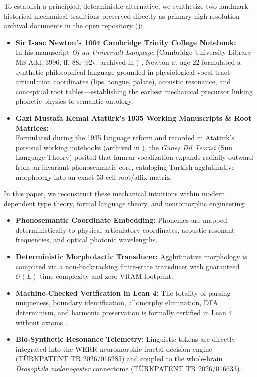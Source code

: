 \documentclass[11pt,letterpaper]{article}
\begin{document}
To establish a principled, deterministic alternative, we synthesize two landmark historical mechanical traditions preserved directly as primary high-resolution archival documents in the open repository ():
\begin{itemize}
    \item \textbf{Sir Isaac Newton's 1664 Cambridge Trinity College Notebook:}\\
    In his manuscript \textit{Of an Universall Language} (Cambridge University Library MS Add. 3996, ff. 88r--92v; archived in ) \cite{newton1664universal}, Newton at age 22 formulated a synthetic philosophical language grounded in physiological vocal tract articulation coordinates (lips, tongue, palate), acoustic resonance, and conceptual root tables---establishing the earliest mechanical precursor linking phonetic physics to semantic ontology.
    \item \textbf{Gazi Mustafa Kemal Atat\"{u}rk's 1935 Working Manuscripts \& Root Matrices:}\\
    Formulated during the 1935 language reform and recorded in Atat\"{u}rk's personal working notebooks \cite{ataturk1935nobet, kosay1936gunes, tdk1936kurultay} (archived in ), the \textit{G\"{u}ne\c{s} Dil Teorisi} (Sun Language Theory) posited that human vocalization expands radially outward from an invariant phonosemantic core, cataloging Turkish agglutinative morphology into an exact 53-cell root/affix matrix.
\end{itemize}

In this paper, we reconstruct these mechanical intuitions within modern dependent type theory, formal language theory, and neuromorphic engineering:
\begin{itemize}
    \item \textbf{Phonosemantic Coordinate Embedding:} Phonemes are mapped deterministically to physical articulatory coordinates, acoustic resonant frequencies, and optical photonic wavelengths.
    \item \textbf{Deterministic Morphotactic Transducer:} Agglutinative morphology is computed via a non-backtracking finite-state transducer with guaranteed $\mathcal{O}(L)$ time complexity and zero VRAM footprint.
    \item \textbf{Machine-Checked Verification in Lean 4:} The totality of parsing uniqueness, boundary identification, allomorphy elimination, DFA determinism, and harmonic preservation is formally certified in Lean 4 without axioms \cite{moura2021lean4}.
    \item \textbf{Bio-Synthetic Resonance Telemetry:} Linguistic tokens are directly integrated into the WERR neuromorphic fractal decision engine (T\"{U}RKPATENT TR 2026/016285) \cite{dagli2026werr1, dagli2026werr2} and coupled to the whole-brain \textit{Drosophila melanogaster} connectome (T\"{U}RKPATENT TR 2026/016633) \cite{dagli2026werrsoma, dorkenwald2024flywire, schlegel2024whole}.
\end{itemize}
\end{document}
